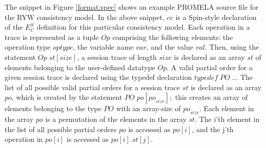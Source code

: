 \documentclass[journal, compsoc]{IEEEtran}
\begin{document}
	\par %
	The snippet in Figure \ref{format:spec} shows an example PROMELA  source file for the RYW consistency model. In the above snippet, $\mathit{cc}$ is a Spin-style declaration of the $E^S_C$ definition for this particular consistency model. 
	Each operation in a trace is represented as a tuple  $\mathit{Op}$ comprising the following elements: the operation type $\mathit{optype}$, the variable name $\mathit{var}$, and the value $\mathit{val}$.  Then, using the statement $\mathit{Op} \; \mathit{st}[\mathit{size}]$, a session trace of length $\mathit{size}$ is declared as an array $\mathit{st} $ of elements belonging to the user-defined datatype $\mathit{Op}$.   A valid partial order for a given session trace is declared using the typedef declaration $\mathit{typedef}\; \mathit{PO}\; ...$  The list of all possible valid partial orders for a session trace $\mathit{st}$ is declared as an array $\mathit{po}$, which is created by the statement $\mathit{PO}\; \mathit{po}[\mathit{po}_\mathit{size}];$ this creates an array of elements belonging to the type $\mathit{PO}$ with an  array-size of $\mathit{po}_\mathit{size}$. Each element in the array $\mathit{po}$ is a permutation of the elements in the array $\mathit{st}$. The i'th element in the list of all possible partial orders $\mathit{po}$ is accessed as $\mathit{po}[i]$, and the j'th operation in $\mathit{po}[i]$ is accessed as $\mathit{po}[i].\mathit{st}[j]$. 
\end{document}
